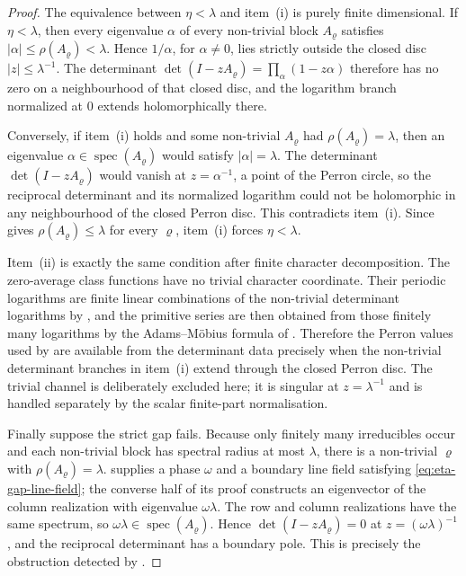 \documentclass[11pt,a4paper]{amsart}
\theoremstyle{plain}
\theoremstyle{definition}
\theoremstyle{remark}
\DeclareMathOperator{\spec}{spec}
\begin{document}
\begin{proof}
  The equivalence between \(\eta<\lambda\) and item~\textup{(i)} is purely
  finite dimensional.  If \(\eta<\lambda\), then every eigenvalue \(\alpha\)
  of every non-trivial block \(A_\varrho\) satisfies
  \(|\alpha|\le\rho(A_\varrho)<\lambda\).  Hence
  \(1/\alpha\), for \(\alpha\neq0\), lies strictly outside the closed disc
  \(|z|\le\lambda^{-1}\).  The determinant
  \(\det(I-zA_\varrho)
  =\prod_\alpha(1-z\alpha)\) therefore has no zero on a neighbourhood of
  that closed disc, and the logarithm branch normalized at \(0\) extends
  holomorphically there.

  Conversely, if item~\textup{(i)} holds and some non-trivial
  \(A_\varrho\) had \(\rho(A_\varrho)=\lambda\), then an eigenvalue
  \(\alpha\in\spec(A_\varrho)\) would satisfy \(|\alpha|=\lambda\).  The
  determinant \(\det(I-zA_\varrho)\) would vanish at
  \(z=\alpha^{-1}\), a point of the Perron circle, so the
  reciprocal determinant and its normalized logarithm could not be
  holomorphic in any neighbourhood of the closed Perron disc.  This
  contradicts item~\textup{(i)}.  Since
   gives
  \(\rho(A_\varrho)\le\lambda\) for every \(\varrho\), item~\textup{(i)}
  forces \(\eta<\lambda\).

  Item~\textup{(ii)} is exactly the same condition after finite character
  decomposition.  The zero-average class functions have no trivial
  character coordinate.  Their periodic logarithms are finite linear
  combinations of the non-trivial determinant logarithms by
  , and the primitive series are then
  obtained from those finitely many logarithms by the Adams--M\"obius formula
  of .  Therefore the Perron values
  used by 
  are available from the determinant data precisely when the
  non-trivial determinant branches in item~\textup{(i)} extend through the
  closed Perron disc.  The trivial channel is deliberately excluded here;
  it is singular at \(z=\lambda^{-1}\) and is handled separately by the
  scalar finite-part normalisation.

  Finally suppose the strict gap fails.  Because only finitely many
  irreducibles occur and each non-trivial block has spectral radius at most
  \(\lambda\), there is a non-trivial \(\varrho\) with
  \(\rho(A_\varrho)=\lambda\).   supplies a phase
  \(\omega\) and a boundary line field satisfying
  \eqref{eq:eta-gap-line-field}; the converse half of its proof constructs
  an eigenvector of the column realization with eigenvalue
  \(\omega\lambda\).  The row and column realizations have the same spectrum,
  so \(\omega\lambda\in\spec(A_\varrho)\).  Hence
  \(\det(I-zA_\varrho)=0\) at \(z=(\omega\lambda)^{-1}\), and the reciprocal
  determinant has a boundary pole.  This is precisely the obstruction
  detected by .
\end{proof}
\end{document}
